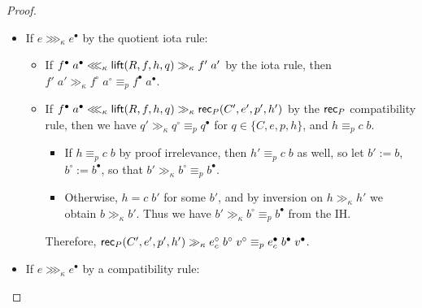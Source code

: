 \begin{proof}
\begin{itemize}
\begin{itemize}
then either $c\;b_1\equiv_p c\;b_2$ by compatibility rules, so that $b_1\equiv_p b_2$ and hence , then $e_c'\;b'\;v'\gg_\kappa e_c^\circ\;b^\circ\;v^\circ\equiv_p e_c^\bullet\;b^\bullet\;v^\bullet$.
\item If $e_c^\bullet\;b^\bullet\;v^\bullet\lll_\kappa \rec_P(C,e,p,h)\gg_\kappa \rec_P(C',e',p',h')$ by the $\rec_P$ compatibility rule, then we have $q'\gg_\kappa q^\circ\equiv_p q^\bullet$ for $q\in\{C,e,p,h\}$, and $h\equiv_p c\;b$.
\begin{itemize}
\item If $h\equiv_p c\;b$ by proof irrelevance, then $h'\equiv_p c\;b$ as well, so let $b':=b$, $b^\circ:=b^\bullet$, so that $b'\gg_\kappa b^\circ\equiv_p b^\bullet$.
\item Otherwise, $h=c\;b'$ for some $b'$, and by inversion on $h\gg_\kappa h'$ we obtain $b\gg_\kappa b'$. Thus we have $b'\gg_\kappa b^\circ\equiv_p b^\bullet$ from the IH.
\end{itemize}
Therefore, $\rec_P(C',e',p',h')\gg_\kappa e_c^\circ\;b^\circ\;v^\circ\equiv_p e_c^\bullet\;b^\bullet\;v^\bullet$.
\end{itemize}
\item If $e\ggg_\kappa e^\bullet$ by the quotient iota rule:
\begin{itemize}
\item If $f^\bullet\;a^\bullet\lll_\kappa \mathsf{lift}(R,f,h,q)\gg_\kappa f'\;a'$ by the iota rule, then $f'\;a'\gg_\kappa f^\circ\;a^\circ\equiv_p f^\bullet\;a^\bullet$.
\item If $f^\bullet\;a^\bullet\lll_\kappa \mathsf{lift}(R,f,h,q)\gg_\kappa \mathsf{rec}_P(C',e',p',h')$ by the $\rec_P$ compatibility rule, then we have $q'\gg_\kappa q^\circ\equiv_p q^\bullet$ for $q\in\{C,e,p,h\}$, and $h\equiv_p c\;b$.
\begin{itemize}
\item If $h\equiv_p c\;b$ by proof irrelevance, then $h'\equiv_p c\;b$ as well, so let $b':=b$, $b^\circ:=b^\bullet$, so that $b'\gg_\kappa b^\circ\equiv_p b^\bullet$.
\item Otherwise, $h=c\;b'$ for some $b'$, and by inversion on $h\gg_\kappa h'$ we obtain $b\gg_\kappa b'$. Thus we have $b'\gg_\kappa b^\circ\equiv_p b^\bullet$ from the IH.
\end{itemize}
Therefore, $\rec_P(C',e',p',h')\gg_\kappa e_c^\circ\;b^\circ\;v^\circ\equiv_p e_c^\bullet\;b^\bullet\;v^\bullet$.
\end{itemize}
\item If $e\ggg_\kappa e^\bullet$ by a compatibility rule:
\begin{itemize}

\end{itemize}
\end{itemize}
\end{proof}
